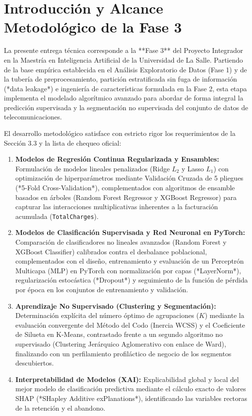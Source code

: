 \documentclass[11pt,letterpaper]{article}
\begin{document}
\section{Introducción y Alcance Metodológico de la Fase 3}

La presente entrega técnica corresponde a la **Fase 3** del Proyecto Integrador en la Maestría en Inteligencia Artificial de la Universidad de La Salle. Partiendo de la base empírica establecida en el Análisis Exploratorio de Datos (Fase 1) y de la tubería de preprocesamiento, partición estratificada sin fuga de información (*data leakage*) e ingeniería de características formulada en la Fase 2, esta etapa implementa el modelado algorítmico avanzado para abordar de forma integral la predicción supervisada y la segmentación no supervisada del conjunto de datos de telecomunicaciones.

El desarrollo metodológico satisface con estricto rigor los requerimientos de la Sección 3.3 y la lista de chequeo oficial:
\begin{enumerate}
    \item \textbf{Modelos de Regresión Continua Regularizada y Ensambles:} Formulación de modelos lineales penalizados (Ridge $L_2$ y Lasso $L_1$) con optimización de hiperparámetros mediante Validación Cruzada de 5 pliegues (*5-Fold Cross-Validation*), complementados con algoritmos de ensamble basados en árboles (Random Forest Regressor y XGBoost Regressor) para capturar las interacciones multiplicativas inherentes a la facturación acumulada (\texttt{TotalCharges}).
    \item \textbf{Modelos de Clasificación Supervisada y Red Neuronal en PyTorch:} Comparación de clasificadores no lineales avanzados (Random Forest y XGBoost Classifier) calibrados contra el desbalance poblacional, complementados con el diseño, entrenamiento y evaluación de un Perceptrón Multicapa (MLP) en PyTorch con normalización por capas (*LayerNorm*), regularización estocástica (*Dropout*) y seguimiento de la función de pérdida por época en los conjuntos de entrenamiento y validación.
    \item \textbf{Aprendizaje No Supervisado (Clustering y Segmentación):} Determinación explícita del número óptimo de agrupaciones ($K$) mediante la evaluación convergente del Método del Codo (Inercia WCSS) y el Coeficiente de Silueta en K-Means, contrastado frente a un segundo algoritmo no supervisado (Clustering Jerárquico Aglomerativo con enlace de Ward), finalizando con un perfilamiento profiláctico de negocio de los segmentos descubiertos.
    \item \textbf{Interpretabilidad de Modelos (XAI):} Explicabilidad global y local del mejor modelo de clasificación predictiva mediante el cálculo exacto de valores SHAP (*SHapley Additive exPlanations*), identificando las variables rectoras de la retención y el abandono.
\end{enumerate}
\end{document}

